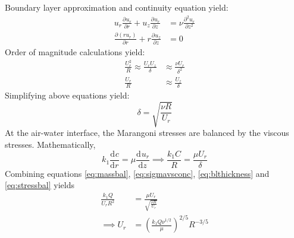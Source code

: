 \documentclass[journal=langd5, manuscript=article, layout=twocolumn]{achemso}
\newcommand{\tdc}[3][]{\frac{\mathrm{d}^{#1}#2}{\mathrm{d}#3^{#1}}} %
\newcommand{\pdc}[3][]{\frac{\partial^{#1} #2}{\partial #3^{#1}}} %
\begin{document}
Boundary layer approximation and continuity equation yield: 
\begin{align*}
u_{r}\pdc{u_{r}}{r} + u_{z}\pdc{u_{r}}{z} &= \nu \pdc[2]{u_{r}}{z} \\
\pdc{(ru_{r})}{r} + r\pdc{u_{z}}{z} &= 0
\end{align*}
Order of magnitude calculations yield:
\begin{align*}
\frac{U_{r}^{2}}{R} \approx \frac{U_{r}U_{z}}{\delta} &\approx \frac{\nu U_{r}}{\delta^{2}} \\ 
\frac{U_{r}}{R} &\approx \frac{U_{z}}{\delta} 
\end{align*}
Simplifying above equations yield:
\begin{equation}\label{eq:blthickness}
\delta = \sqrt{\frac{\nu R}{U_{r}}}
\end{equation}
At the air-water interface, the Marangoni stresses are balanced by the viscous stresses. Mathematically,
\begin{equation}\label{eq:stressbal}
k_{1}\tdc{c}{r} = \mu \tdc{u_{r}}{z} \implies \frac{k_{1}C}{R} = \frac{\mu U_{r}}{\delta}
\end{equation}
Combining equations \eqref{eq:massbal}, \eqref{eq:sigmavsconc}, \eqref{eq:blthickness} and \eqref{eq:stressbal} yields
\begin{align}
\frac{k_{1}Q}{U_{r}R^{2}} &= \frac{\mu U_{r}}{\sqrt{\frac{\nu R}{U_{r}}}} \nonumber \\
\implies U_{r} &= \left(\frac{k_{1}Q\nu^{1/2}}{\mu}\right)^{2/5} R^{-3/5}
\end{align}
\end{document}
